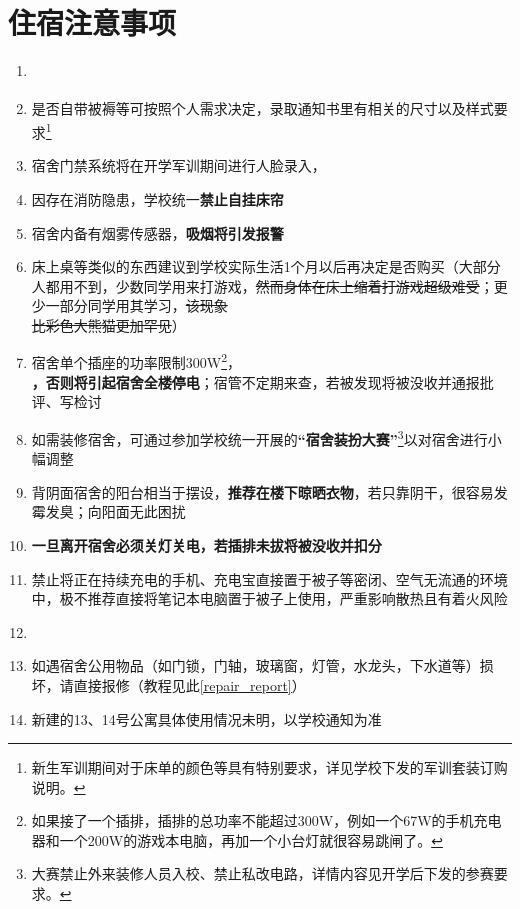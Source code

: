 \section[住宿注意事项]{住宿注意事项}
\begin{enumerate}
    \item \textbf{}
    \item 是否自带被褥等可按照个人需求决定，录取通知书里有相关的尺寸以及样式要求\footnote{新生军训期间对于床单的颜色等具有特别要求，详见学校下发的军训套装订购说明。}
    \item 宿舍门禁系统将在开学军训期间进行人脸录入，\textbf{}
    \item 因存在消防隐患，学校统一\textbf{禁止自挂床帘}
    \item 宿舍内备有烟雾传感器，\textbf{吸烟将引发报警}
    \item 床上桌等类似的东西建议到学校实际生活1个月以后再决定是否购买（大部分人都用不到，少数同学用来打游戏，\sout{然而身体在床上缩着打游戏超级难受}；更少一部分同学用其学习，\sout{该现象\\比彩色大熊猫更加罕见}）
    \item 宿舍单个插座的功率限制300W\footnote{如果接了一个插排，插排的总功率不能超过300W，例如一个67W的手机充电器和一个200W的游戏本电脑，再加一个小台灯就很容易跳闸了。}，\textbf{}\\\textbf{，否则将引起宿舍全楼停电}；宿管不定期来查，若被发现将被没收并通报批评、写检讨
    \item 如需装修宿舍，可通过参加学校统一开展的\textbf{“宿舍装扮大赛”}\footnote{大赛禁止外来装修人员入校、禁止私改电路，详情内容见开学后下发的参赛要求。}以对宿舍进行小幅调整
    \item 背阴面宿舍的阳台相当于摆设，\textbf{推荐在楼下晾晒衣物}，若只靠阴干，很容易发霉发臭；向阳面无此困扰
    \item \textbf{一旦离开宿舍必须关灯关电，若插排未拔将被没收并扣分}
    \item 禁止将正在持续充电的手机、充电宝直接置于被子等密闭、空气无流通的环境中，极不推荐直接将笔记本电脑置于被子上使用，严重影响散热且有着火风险
    \item \textbf{}\\
    \item 如遇宿舍公用物品（如门锁，门轴，玻璃窗，灯管，水龙头，下水道等）损坏，请直接报修（教程见此\uline{\ref{repair_report}}）
    \item 新建的13、14号公寓具体使用情况未明，以学校通知为准
\end{enumerate}

